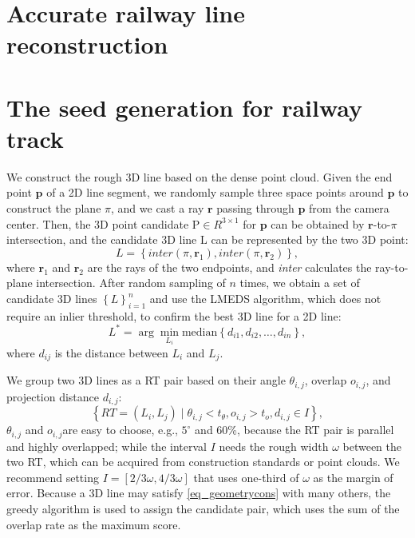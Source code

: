 \section{Accurate railway line reconstruction}

\section{The seed generation for railway track}
We construct the rough 3D line based on the dense point cloud.
Given the end point $\mathbf p$ of a 2D line segment,
we randomly sample three space points around $\mathbf p$ to construct the plane $\pi$,
and we cast a ray $\mathbf r$ passing through $\mathbf p$ from the camera center.
Then,
the 3D point candidate $\mathrm P \in R ^ {3\times1}$ for $\mathbf p$ can be obtained by $\mathbf r$-to-$\pi$ intersection,
and the candidate 3D line $\mathrm L$ can be represented by the two 3D point:
\begin{equation}
    L =\left\{\textit{inter} \left(\pi,\mathbf r_1\right),\textit{inter} \left(\pi,\mathbf r_2\right)  \right\},
\end{equation}
where $\mathbf r_1$ and $\mathbf r_2$ are the rays of the two endpoints,
and \textit{inter} calculates the ray-to-plane intersection.
After random sampling of $n$ times,
we obtain a set of candidate 3D lines $\left\{ L\right\}_{i=1}^n$ and use the LMEDS algorithm,
which does not require an inlier threshold, to confirm the best 3D line for a 2D line:
\begin{equation}
    L^* = \arg\min_{L_i} \text{median} \left\{ d_{i1}, d_{i2}, \dots, d_{in}\right\} ,
\end{equation}
where $d_{ij}$ is the distance between $L_i$ and $L_j$.  

We group two 3D lines as a RT pair based on their angle $\theta_{i,j}$,
overlap $o_{i,j}$,
and projection distance $d_{i,j}$:
\begin{equation}
   \left\{ RT= \left(L_i, L_j\right) \mid \theta_{i,j} < t_\theta, o_{i,j} > t_o, d_{i,j} \in I  \right\},
    \label{eq_geometrycons}
\end{equation}
$\theta_{i,j}$ and $o_{i,j}$are easy to choose,
e.g.,
$5^\circ$ and 60\%,
because the RT pair is parallel and highly overlapped;
while the interval $I$ needs the rough width $\omega$ between the two RT,
which can be acquired from construction standards or point clouds.
We recommend setting $I=\left[2/3\omega,4/3\omega\right]$ that uses one-third of $\omega$ as the margin of error.
Because a 3D line may satisfy \cref{eq_geometrycons} with many others,
the greedy algorithm is used to assign the candidate pair,
which uses the sum of the overlap rate as the maximum score.

